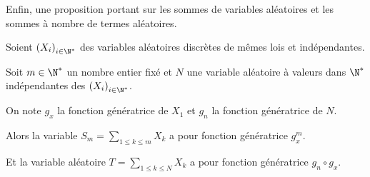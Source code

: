 Enfin, une proposition portant sur les sommes de variables aléatoires et les sommes à nombre de termes aléatoires.

\begin{prop}
Soient $\left(X_i\right)_{i \in \N^*}$ des variables aléatoires discrètes de mêmes lois et indépendantes.

Soit $m \in \N^*$ un nombre entier fixé et $N$ une variable aléatoire à valeurs dans $\N^*$ indépendantes des $\left(X_i\right)_{i \in \N^*}$.


On note $g_x$ la fonction génératrice de $X_1$ et $g_n$ la fonction génératrice de $N$.

Alors la variable $S_m = \displaystyle{\sum \limits_{1 \leq k \leq m}} X_k$ a pour fonction génératrice $g_x^m$.

Et la variable aléatoire $T = \displaystyle{\sum \limits_{1 \leq k \leq N}} X_k$ a pour fonction génératrice $g_n \circ g_x$.
\end{prop}

